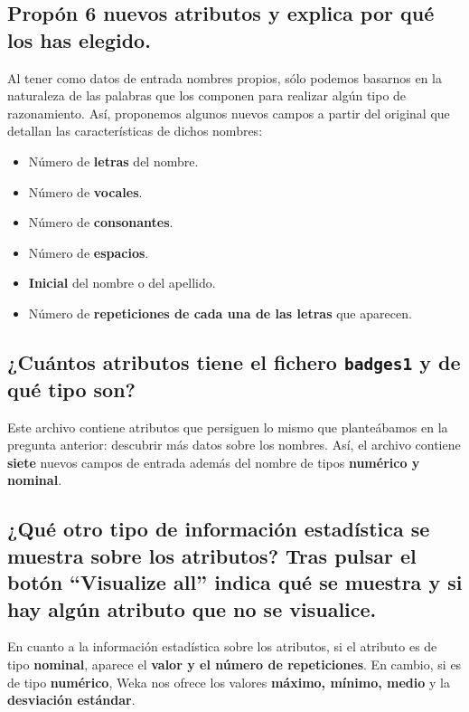 \documentclass[12pt]{article}
\begin{document}
\subsection*{\small Propón 6 nuevos atributos y explica por qué los has elegido.}

Al tener como datos de entrada nombres propios, sólo podemos basarnos en la
naturaleza de las palabras que los componen para realizar algún tipo de
razonamiento. Así, proponemos algunos nuevos campos a partir del original que
detallan las características de dichos nombres:

\begin{itemize}
    \item Número de \textbf{letras} del nombre.
    \item Número de \textbf{vocales}.
    \item Número de \textbf{consonantes}.
    \item Número de \textbf{espacios}.
    \item \textbf{Inicial} del nombre o del apellido.
    \item Número de \textbf{repeticiones de cada una de las letras} que
    aparecen.
\end{itemize}

\subsection*{\small ¿Cuántos atributos tiene el fichero \texttt{badges1} y de
qué tipo son?}

Este archivo contiene atributos que persiguen lo mismo que planteábamos en la
pregunta anterior: descubrir más datos sobre los nombres. Así, el archivo
contiene \textbf{siete} nuevos campos de entrada además del nombre de tipos
\textbf{numérico y nominal}.

\subsection*{\small ¿Qué otro tipo de información estadística se muestra sobre
los atributos? Tras pulsar el botón ``Visualize all'' indica qué se muestra y
si hay algún atributo que no se visualice.}

En cuanto a la información estadística sobre los atributos, si el atributo es
de tipo \textbf{nominal}, aparece el \textbf{valor y el número de
repeticiones}. En cambio, si es de tipo \textbf{numérico}, Weka nos ofrece los
valores \textbf{máximo, mínimo, medio} y la \textbf{desviación estándar}.
\end{document}
